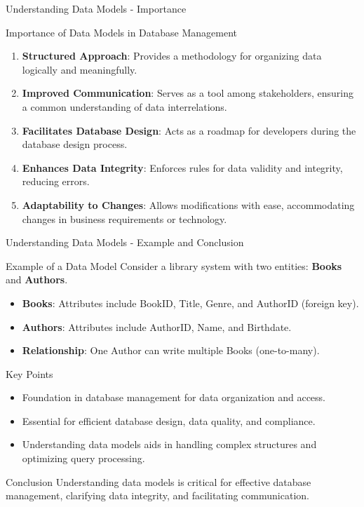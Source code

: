 \documentclass[aspectratio=169]{beamer}
\begin{document}
\begin{frame}[fragile]{Understanding Data Models - Importance}
    \begin{block}{Importance of Data Models in Database Management}
        \begin{enumerate}
            \item \textbf{Structured Approach}: Provides a methodology for organizing data logically and meaningfully.
            \item \textbf{Improved Communication}: Serves as a tool among stakeholders, ensuring a common understanding of data interrelations.
            \item \textbf{Facilitates Database Design}: Acts as a roadmap for developers during the database design process.
            \item \textbf{Enhances Data Integrity}: Enforces rules for data validity and integrity, reducing errors.
            \item \textbf{Adaptability to Changes}: Allows modifications with ease, accommodating changes in business requirements or technology.
        \end{enumerate}
    \end{block}
\end{frame}

\begin{frame}[fragile]{Understanding Data Models - Example and Conclusion}
    \begin{block}{Example of a Data Model}
        Consider a library system with two entities: \textbf{Books} and \textbf{Authors}.
        \begin{itemize}
            \item \textbf{Books}: Attributes include BookID, Title, Genre, and AuthorID (foreign key).
            \item \textbf{Authors}: Attributes include AuthorID, Name, and Birthdate.
            \item \textbf{Relationship}: One Author can write multiple Books (one-to-many).
        \end{itemize}
    \end{block}
    
    \begin{block}{Key Points}
        \begin{itemize}
            \item Foundation in database management for data organization and access.
            \item Essential for efficient database design, data quality, and compliance.
            \item Understanding data models aids in handling complex structures and optimizing query processing.
        \end{itemize}
    \end{block}
    
    \begin{block}{Conclusion}
        Understanding data models is critical for effective database management, clarifying data integrity, and facilitating communication.
    \end{block}
\end{frame}
\end{document}
